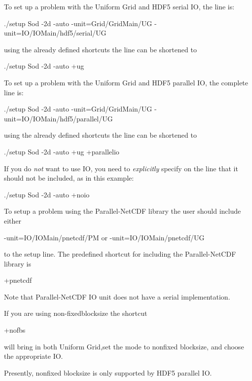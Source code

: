 To set up a problem with the Uniform Grid and HDF5 serial IO,
 the  line is:
\begin{codeseg}
./setup Sod -2d -auto -unit=Grid/GridMain/UG -unit=IO/IOMain/hdf5/serial/UG
\end{codeseg}

using the already defined shortcuts the  line can be shortened to
\begin{codeseg}
./setup Sod -2d -auto +ug
\end{codeseg}



To set up a problem with the Uniform Grid and HDF5 parallel IO,
 the complete  line is:
\begin{codeseg}
./setup Sod -2d -auto -unit=Grid/GridMain/UG -unit=IO/IOMain/hdf5/parallel/UG
\end{codeseg}

using the already defined shortcuts the  line can be shortened to
\begin{codeseg}
./setup Sod -2d -auto +ug  +parallelio
\end{codeseg}

If you do \emph{not} want to use IO, you need to \emph{explicitly} specify on the
 line that it should not be included, as in this example:
\begin{codeseg}
./setup Sod -2d -auto +noio
\end{codeseg}


To setup a problem using the Parallel-NetCDF library the user should include either
\begin{codeseg}
-unit=IO/IOMain/pnetcdf/PM or -unit=IO/IOMain/pnetcdf/UG
\end{codeseg}
to the setup line.  The predefined shortcut for including the Parallel-NetCDF library is
\begin{codeseg}
+pnetcdf
\end{codeseg}
Note that Parallel-NetCDF IO unit does not have a serial implementation.

If you are using non-fixedblocksize the shortcut
\begin{codeseg}
+nofbs
\end{codeseg}
will bring in both Uniform Grid,set the mode to nonfixed blocksize, and 
choose the appropriate IO.
\begin{flashtip}[Note:]
Presently, nonfixed blocksize is only supported by HDF5 parallel IO.
\end{flashtip}

